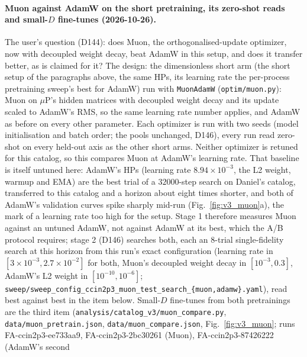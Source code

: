 \documentclass[11pt]{article}
\newcommand{\code}[1]{\texttt{#1}}
\begin{document}
\paragraph{Muon against AdamW on the short pretraining, its zero-shot reads and small-$D$ fine-tunes (2026-10-26).}\label{par:v3_muon} The
user's question (D144): does Muon, the orthogonalised-update optimizer, now with decoupled weight decay, beat AdamW in
this setup, and does it transfer better, as is claimed for it? The design: the dimensionless short arm (the short
setup of the paragraphs above, the same HPs, its learning rate the per-process pretraining sweep's best for AdamW) run
with \code{MuonAdamW} (\code{optim/muon.py}): Muon on $\mu$P's hidden matrices with decoupled weight decay and its
update scaled to AdamW's RMS, so the same learning rate number applies, and AdamW as before on every other parameter.
Each optimizer is run with two seeds (model initialisation and batch order; the pools unchanged, D146), every run
read zero-shot on every held-out axis as the other short arms. Neither optimizer is retuned for this catalog, so this
compares Muon at AdamW's learning rate. That baseline is itself untuned here: AdamW's HPs (learning rate
$8.94\times10^{-3}$, the L2 weight, warmup and EMA) are the best trial of a $32000$-step search on Daniel's catalog,
transferred to this catalog and a horizon about eight times shorter, and both of AdamW's validation curves spike sharply
mid-run (Fig.~\ref{fig:v3_muon}a), the mark of a learning rate too high for the setup. Stage 1 therefore measures Muon
against an untuned AdamW, not against AdamW at its best, which the A/B protocol requires; stage 2 (D146) searches both,
each an 8-trial single-fidelity search at this horizon from this run's exact configuration (learning rate in
$[3\times10^{-3}, 2.7\times10^{-2}]$ for both, Muon's decoupled weight decay in $[10^{-3}, 0.3]$, AdamW's L2 weight in
$[10^{-10}, 10^{-6}]$; \code{sweep/sweep\_config\_ccin2p3\_muon\_test\_search\_\{muon,adamw\}.yaml}), read best
against best in the item below.
Small-$D$ fine-tunes from both pretrainings are the third item
(\code{analysis/catalog\_v3/muon\_compare.py}, \code{data/muon\_pretrain.json}, \code{data/muon\_compare.json},
Fig.~\ref{fig:v3_muon}; runs FA-ccin2p3-ee733aa9, FA-ccin2p3-2bc30261 (Muon), FA-ccin2p3-87426222 (AdamW's second
\end{document}
